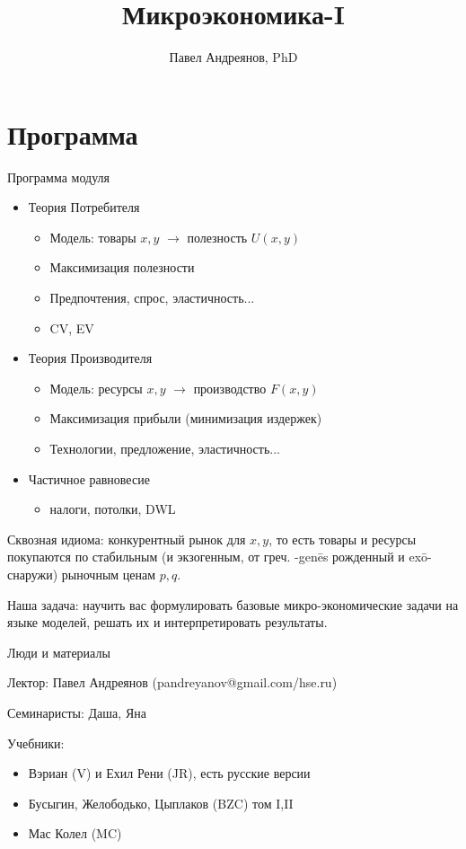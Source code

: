 \documentclass{beamer}
\title{
Микроэкономика-I
}
\author{
Павел Андреянов, PhD
}
\begin{document}
\maketitle

\section{Программа}

\begin{frame}{Программа модуля}
\begin{itemize}
\item Теория Потребителя
\begin{itemize}
\item Модель: товары $x, y$ $\to$ полезность $U(x,y)$
\item Максимизация полезности
\item Предпочтения, спрос, эластичность...
\item CV, EV
\end{itemize}
\item Теория Производителя
\begin{itemize}
\item Модель: ресурсы $x, y$ $\to$ производство $F(x,y)$
\item Максимизация прибыли (минимизация издержек)
\item Технологии, предложение, эластичность...
\end{itemize}
\item Частичное равновесие
\begin{itemize}
\item налоги, потолки, DWL
\end{itemize}
\end{itemize}
\end{frame}

\begin{frame}

Сквозная идиома: \alert{конкурентный рынок} для $x, y$, то есть товары и ресурсы покупаются по стабильным (и \alert{экзогенным}, от греч. -genēs рожденный и  exō- снаружи) рыночным ценам $p, q$. 

Наша задача: научить вас формулировать базовые микро-экономические задачи на языке моделей, решать их и интерпретировать результаты.

\end{frame}

\begin{frame}{Люди и материалы}

Лектор: Павел Андреянов (pandreyanov@gmail.com/hse.ru)

Семинаристы: Даша, Яна

Учебники:
\begin{itemize}
\item Вэриан (V) и Ехил Рени (JR), есть русские версии
\item Бусыгин, Желободько, Цыплаков (BZC) том I,II
\item Мас Колел (MC)
\end{itemize}

\end{frame}
\end{document}
